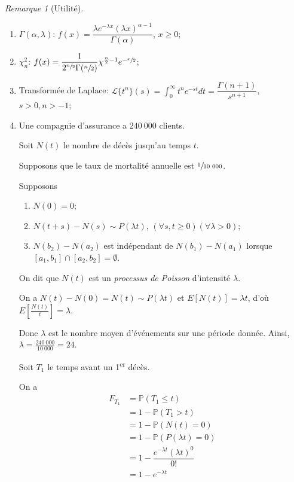 \documentclass{report}
\newcommand*{\dint}[3]{\displaystyle\int_{#1}^{#2}#3}
\newcommand*{\lte}{\leqslant}
\newcommand*{\gte}{\geqslant}
\theoremstyle{definition}
\theoremstyle{remark}
\newtheorem*{rema}{Remarque}
\begin{document}
	\begin{rema}[Utilit\'e]~

		\begin{enumerate}[label=\alph*)]
			\item $\Gamma(\alpha, \lambda)$: $f(x) = \dfrac{\lambda e^{-\lambda x} (\lambda x)^{\alpha-1}}{\Gamma(\alpha)}$, $x \gte 0$;
			\item $\chi^2_n$: $f(x) = \dfrac{1}{2^{\sfrac{n}{2}} \Gamma(\sfrac{n}{2})} \chi^{\frac{n}{2}-1} e^{-\sfrac{x}{2}}$;
			\item Transform\'ee de Laplace: $\mathscr{L}\{t^n\}(s) = \dint{0}{\infty}{t^n e^{-st} dt} = \dfrac{\Gamma(n+1)}{s^{n+1}}$, $s>0, n>-1$;
			\item Une compagnie d'assurance a $240~000$ clients.

			Soit $N(t)$ le nombre de d\'ec\`es jusqu'au temps $t$.

			Supposons que le taux de mortalit\'e annuelle est $\sfrac{1}{10~000}$.

			Supposons
			\begin{enumerate}[label=\roman*)]
				\item $N(0)=0$;
				\item $N(t+s)-N(s) \sim P(\lambda t)$, $(\forall s,t \gte 0) (\forall\lambda>0)$;
				\item $N(b_2)-N(a_2)$ est ind\'ependant de $N(b_1)-N(a_1)$ lorsque $[a_1,b_1] \cap [a_2,b_2] = \emptyset$.
			\end{enumerate}

			On dit que $N(t)$ est un \emph{processus de Poisson} d'intensit\'e $\lambda$.

			On a $N(t)-N(0) = N(t) \sim P(\lambda t)$ et $E[N(t)] = \lambda t$, d'o\`u $E\left[\frac{N(t)}{t}\right]=\lambda$.

			Donc $\lambda$ est le nombre moyen d'\'ev\'enements sur une p\'eriode donn\'ee. Ainsi, $\lambda=\frac{240~000}{10~000} = 24$.

			Soit $T_1$ le temps avant un 1\textsuperscript{er} d\'ec\`es.

			On a
			\begin{align*}
				F_{T_1}&= \mathbb{P}(T_1 \lte t)\\
				&= 1 - \mathbb{P}(T_1 > t)\\
				&= 1-\mathbb{P}(N(t)=0)\\
				&= 1-\mathbb{P}(P(\lambda t)=0)\\
				&= 1-\dfrac{e^{-\lambda t}(\lambda t)^0}{0!}\\
				&= 1-e^{-\lambda t}
			\end{align*}


\end{enumerate}
\end{rema}
\end{document}
